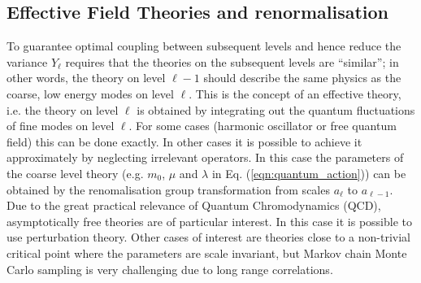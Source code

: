 \documentclass[11pt]{article}
\begin{document}
\subsection{Effective Field Theories and renormalisation}
To guarantee optimal coupling between subsequent levels and hence reduce the variance $Y_\ell$ requires that the theories on the subsequent levels are ``similar''; in other words, the theory on level $\ell-1$ should describe the same physics as the coarse, low energy modes on level $\ell$. This is the concept of an effective theory, i.e. the theory on level $\ell$ is obtained by integrating out the quantum fluctuations of fine modes on level $\ell$. For some cases (harmonic oscillator or free quantum field) this can be done exactly. In other cases it is possible to achieve it approximately by neglecting irrelevant operators. In this case the parameters of the coarse level theory (e.g. $m_0$, $\mu$ and $\lambda$ in Eq. (\ref{eqn:quantum_action})) can be obtained by the renomalisation group transformation from scales $a_\ell$ to $a_{\ell-1}$. Due to the great practical relevance of Quantum Chromodynamics (QCD), asymptotically free theories are of particular interest. In this case it is possible to use perturbation theory. Other cases of interest are theories close to a non-trivial critical point where the parameters are scale invariant, but Markov chain Monte Carlo sampling is very challenging due to long range correlations.
\end{document}
